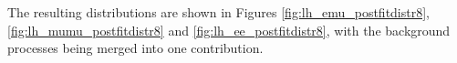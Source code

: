 The resulting distributions are shown in Figures \ref{fig:lh_emu_postfitdistr8}, \ref{fig:lh_mumu_postfitdistr8} and \ref{fig:lh_ee_postfitdistr8}, with the background processes
being merged into one contribution.




\begin{figure}[htbp!]
  \begin{center}


\end{center}
\end{figure}
